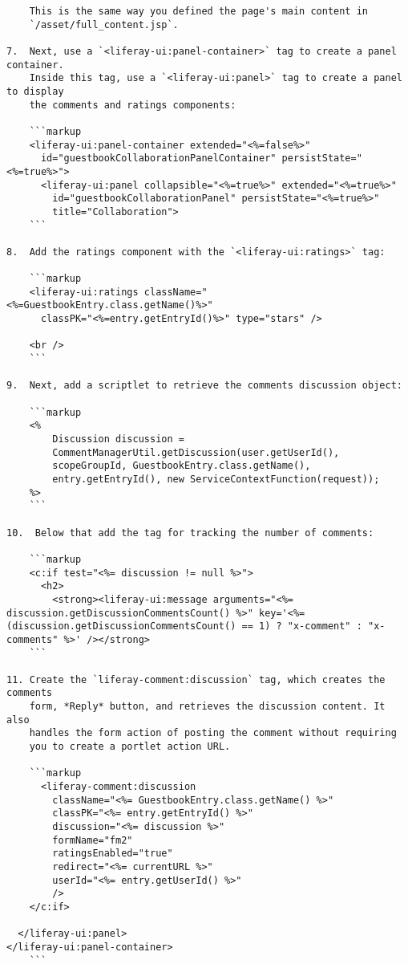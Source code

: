 \begin{verbatim}
    This is the same way you defined the page's main content in 
    `/asset/full_content.jsp`. 

7.  Next, use a `<liferay-ui:panel-container>` tag to create a panel container. 
    Inside this tag, use a `<liferay-ui:panel>` tag to create a panel to display
    the comments and ratings components: 

    ```markup
    <liferay-ui:panel-container extended="<%=false%>"
      id="guestbookCollaborationPanelContainer" persistState="<%=true%>">
      <liferay-ui:panel collapsible="<%=true%>" extended="<%=true%>"
        id="guestbookCollaborationPanel" persistState="<%=true%>"
        title="Collaboration">
    ```

8.  Add the ratings component with the `<liferay-ui:ratings>` tag:

    ```markup
    <liferay-ui:ratings className="<%=GuestbookEntry.class.getName()%>"
      classPK="<%=entry.getEntryId()%>" type="stars" />

    <br />
    ```

9.  Next, add a scriptlet to retrieve the comments discussion object:

    ```markup
    <% 
        Discussion discussion = 
        CommentManagerUtil.getDiscussion(user.getUserId(), 
        scopeGroupId, GuestbookEntry.class.getName(), 
        entry.getEntryId(), new ServiceContextFunction(request));
    %>
    ```

10.  Below that add the tag for tracking the number of comments:

    ```markup
    <c:if test="<%= discussion != null %>">
      <h2>
        <strong><liferay-ui:message arguments="<%= discussion.getDiscussionCommentsCount() %>" key='<%= (discussion.getDiscussionCommentsCount() == 1) ? "x-comment" : "x-comments" %>' /></strong>
    ```

11. Create the `liferay-comment:discussion` tag, which creates the comments
    form, *Reply* button, and retrieves the discussion content. It also
    handles the form action of posting the comment without requiring
    you to create a portlet action URL.

    ```markup
      <liferay-comment:discussion
        className="<%= GuestbookEntry.class.getName() %>"
        classPK="<%= entry.getEntryId() %>"
        discussion="<%= discussion %>"
        formName="fm2"
        ratingsEnabled="true"
        redirect="<%= currentURL %>"
        userId="<%= entry.getUserId() %>"
        />
    </c:if>

  </liferay-ui:panel>
</liferay-ui:panel-container>
    ```


\end{verbatim}
